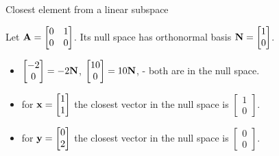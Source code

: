 \documentclass{beamer}
\begin{document}
\begin{frame}{Closest element from a linear subspace}
\begin{flushleft}

Let $\mathbf{A} = \begin{bmatrix} 0 & 1 \\ 0 & 0\end{bmatrix}$. Its null space has orthonormal basis $\mathbf{N} = \begin{bmatrix} 1 \\ 0\end{bmatrix}$. 

\begin{itemize}
    \item $\begin{bmatrix} -2 \\ 0 \end{bmatrix} = 
    -2 \mathbf{N}$,
    $\begin{bmatrix} 10 \\ 0 \end{bmatrix} = 
    10 \mathbf{N}$, - both are in the null space.
    \item for $\mathbf{x} = \begin{bmatrix} 1 \\ 1 \end{bmatrix}$ the closest vector in the null space is $\begin{bmatrix} 1 \\ 0 \end{bmatrix}$.
    \item for $\mathbf{y} = \begin{bmatrix} 0 \\ 2 \end{bmatrix}$ the closest vector in the null space is $\begin{bmatrix} 0 \\ 0 \end{bmatrix}$.
\end{itemize}


\end{flushleft}
\end{frame}
\end{document}
